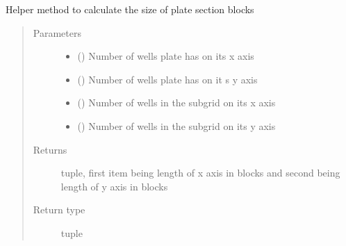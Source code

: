 \documentclass[letterpaper,10pt,english]{sphinxmanual}
\begin{document}
\begin{fulllineitems}
\begin{fulllineitems}
\end{fulllineitems}


\begin{fulllineitems}
\label{\detokenize{polo.widgets:polo.widgets.plate_visualizer.PlateVisualizer.block_dims}}
Helper method to calculate the size of plate section
blocks
\begin{quote}\begin{description}
\item[{Parameters}] \leavevmode\begin{itemize}
\item {} 
 () \textendash{} Number of wells plate has on its x axis

\item {} 
 () \textendash{} Number of wells plate has on it s y axis

\item {} 
 () \textendash{} Number of wells in the subgrid on its x axis

\item {} 
 () \textendash{} Number of wells in the subgrid on its y axis

\end{itemize}

\item[{Returns}] \leavevmode
tuple, first item being length of x axis in
blocks and second being length of y axis in blocks

\item[{Return type}] \leavevmode
tuple

\end{description}\end{quote}

\end{fulllineitems}


\end{fulllineitems}
\end{document}
